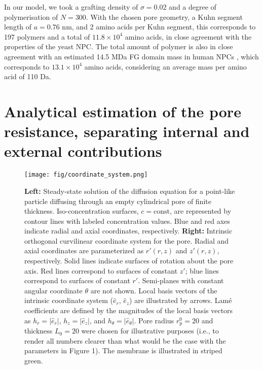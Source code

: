 \documentclass[10pt, a4paper, twocolumn]{article}
\begin{document}
In our model, we took a grafting density of $\sigma = 0.02$ and a degree of polymerisation of $N = 300$.
With the chosen pore geometry, a Kuhn segment length of $a = 0.76$ nm, and 2 amino acids per Kuhn segment, this corresponds to 197 polymers and a total of $11.8 \times 10^4$ amino acids, in close agreement with the properties of the yeast NPC.
The total amount of polymer is also in close agreement with an estimated 14.5 MDa FG domain mass in human NPCs \cite{Ng2023}, which corresponds to $13.1 \times 10^4$ amino acids, considering an average mass per amino acid of 110 Da.


\pagebreak
\section{Analytical estimation of the pore resistance, separating internal and external contributions}

\begin{figure*}[h]
    \centering
    \texttt{[image: fig/coordinate\_system.png]}
    \caption{%
        \textbf{Left:}
        Steady-state solution of the diffusion equation for a point-like particle diffusing through an empty cylindrical pore of finite thickness.
        Iso-concentration surfaces, $c = \text{const}$, are represented by contour lines with labeled concentration values.
        Blue and red axes indicate radial and axial coordinates, respectively.
        \textbf{Right:}
        Intrinsic orthogonal curvilinear coordinate system for the pore.
        Radial and axial coordinates are parameterized as $r'(r,z)$ and $z'(r,z)$, respectively.
        Solid lines indicate surfaces of rotation about the pore axis.
        Red lines correspond to surfaces of constant $z'$; blue lines correspond to surfaces of constant $r'$.
        Semi-planes with constant angular coordinate $\theta$ are not shown.
        Local basis vectors of the intrinsic coordinate system ($\hat{e}_r$, $\hat{e}_z$) are illustrated by arrows.
        Lamé coefficients are defined by the magnitudes of the local basis vectors as $h_r = |\hat{e}_r|$, $h_z = |\hat{e}_z|$, and $h_{\theta} = |\hat{e}_{\theta}|$.
        Pore radius $r_{\text{p}}^{0} = 20$ and thickness $L_{0} = 20$ were chosen for illustrative purposes (i.e., to render all numbers clearer than what would be the case with the parameters in Figure 1).
        The membrane is illustrated in striped green.
    }
    \label{fig:empty_pore_solution}    
\end{figure*}
\end{document}
